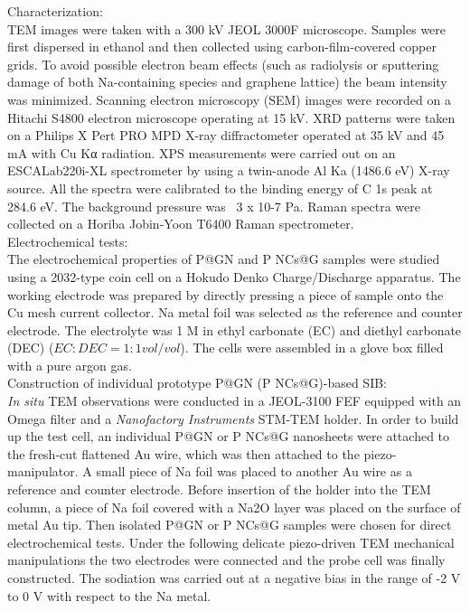 Characterization: \\
TEM images were taken with a 300 kV JEOL 3000F microscope. Samples were first dispersed in ethanol and then collected using carbon-film-covered copper grids. To avoid possible electron beam effects (such as radiolysis or sputtering damage of both Na-containing species and graphene lattice) the beam intensity was minimized. Scanning electron microscopy (SEM) images were recorded on a Hitachi S4800 electron microscope operating at 15 kV. XRD patterns were taken on a Philips X Pert PRO MPD X-ray diffractometer operated at 35 kV and 45 mA with Cu Kα radiation. XPS measurements were carried out on an ESCALab220i-XL spectrometer by using a twin-anode Al Ka (1486.6 eV) X-ray source. All the spectra were calibrated to the binding energy of C 1s peak at 284.6 eV. The background pressure was ~3 x 10-7 Pa. Raman spectra were collected on a Horiba Jobin-Yoon T6400 Raman spectrometer.\\

Electrochemical tests: \\
The electrochemical properties of P@GN and P NCs@G samples were studied using a 2032-type coin cell on a Hokudo Denko Charge/Discharge apparatus. The working electrode was prepared by directly pressing a piece of sample onto the Cu mesh current collector. Na metal foil was selected as the reference and counter electrode. The electrolyte was 1 M  in ethyl carbonate (EC) and diethyl carbonate (DEC) ($EC : DEC = 1 : 1 vol/vol$). The cells were assembled in a glove box filled with a pure argon gas.\\ 

Construction of individual prototype P@GN (P NCs@G)-based SIB: \\
\textit{In situ} TEM observations were conducted in a JEOL-3100 FEF equipped with an Omega filter and a {\em Nanofactory Instruments} STM-TEM holder. In order to build up the test cell, an individual P@GN or P NCs@G nanosheets were attached to the fresh-cut flattened Au wire, which was then attached to the piezo-manipulator. A small piece of Na foil was placed to another Au wire as a reference and counter electrode. Before insertion of the holder into the TEM column, a piece of Na foil covered with a Na2O layer was placed on the surface of metal Au tip. Then isolated P@GN or P NCs@G samples were chosen for direct electrochemical tests. Under the following delicate piezo-driven TEM mechanical manipulations the two electrodes were connected and the probe cell was finally constructed. The sodiation was carried out at a negative bias in the range of -2 V to 0 V with respect to the Na metal.\\

